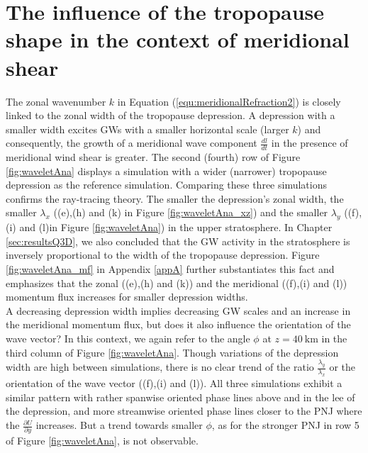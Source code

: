 \section{The influence of the tropopause shape in the context of meridional shear}
\label{sec:3D_shape}
The zonal wavenumber $k$ in Equation (\ref{equ:meridionalRefraction2}) is closely linked to the zonal width of the tropopause depression. A depression with a smaller width excites GWs with a smaller horizontal scale (larger $k$) and consequently, the growth of a meridional wave component $\frac{dl}{dt}$ in the presence of meridional wind shear is greater. The second (fourth) row of Figure \ref{fig:waveletAna} displays a simulation with a wider (narrower) tropopause depression as the reference simulation. Comparing these three simulations confirms the ray-tracing theory. The smaller the depression's zonal width, the smaller $\lambda_x$ ((e),(h) and (k) in Figure \ref{fig:waveletAna_xz}) and the smaller $\lambda_y$ ((f),(i) and (l)in Figure \ref{fig:waveletAna}) in the upper stratosphere. In Chapter \ref{sec:resultsQ3D}, we also concluded that the GW activity in the stratosphere is inversely proportional to the width of the tropopause depression. Figure \ref{fig:waveletAna_mf} in Appendix \ref{appA} further substantiates this fact and emphasizes that the zonal ((e),(h) and (k)) and the meridional ((f),(i) and (l)) momentum flux increases for smaller depression widths. \\
A decreasing depression width implies decreasing GW scales and an increase in the meridional momentum flux, but does it also influence the orientation of the wave vector? In this context, we again refer to the angle $\phi$ at $z=\SI{40}{\kilo\meter}$ in the third column of Figure \ref{fig:waveletAna}. Though variations of the depression width are high between simulations, there is no clear trend of the ratio $\frac{\lambda_y}{\lambda_x}$ or the orientation of the wave vector ((f),(i) and (l)). All three simulations exhibit a similar pattern with rather spanwise oriented phase lines above and in the lee of the depression, and more streamwise oriented phase lines closer to the PNJ where the $\frac{\partial U}{\partial y}$ increases. But a trend towards smaller $\phi$, as for the stronger PNJ in row 5 of Figure \ref{fig:waveletAna}, is not observable.

